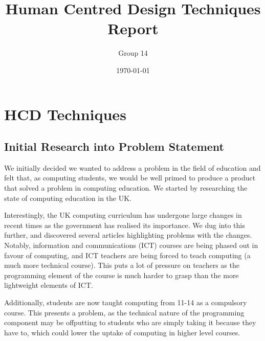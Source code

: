 \documentclass[a4wide, 11pt]{article}
\begin{document}
\title{Human Centred Design Techniques Report}

\author{Group 14}

\date{\today}         %

\maketitle            %


\section{HCD Techniques}

\subsection{Initial Research into Problem Statement} 

We initially decided we wanted to address a problem in the field of education and felt that, as computing students, we would be well primed to produce a product that solved a problem in computing education. We started by researching the state of computing education in the UK.

Interestingly, the UK computing curriculum has undergone large changes in recent times as the government has realised its importance. We dug into this further, and discovered several articles highlighting problems with the changes. Notably, information and communications (ICT) courses are being phased out in favour of computing, and ICT teachers are being forced to teach computing (a much more technical course). This puts a lot of pressure on teachers as the programming element of the course is much harder to grasp than the more lightweight elements of ICT.

Additionally, students are now taught computing from 11-14 as a compulsory course. This presents a problem, as the technical nature of the programming component may be offputting to students who are simply taking it because they have to, which could lower the uptake of computing in higher level courses.
\end{document}
